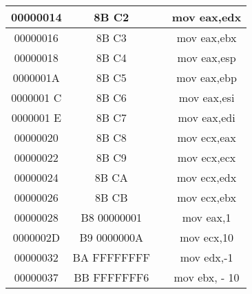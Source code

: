 \documentclass[10pt]{article}
\begin{document}
\begin{center}
\begin{tabular}{|c|c|c|c|}
\hline
00000014 & 8B C2 &  & mov eax,edx \\
\hline
00000016 & 8B C3 &  & mov eax,ebx \\
\hline
00000018 & 8B C4 &  & mov eax,esp \\
\hline
0000001A & 8B C5 &  & mov eax,ebp \\
\hline
0000001 C & 8B C6 &  & mov eax,esi \\
\hline
0000001 E & 8B C7 &  & mov eax,edi \\
\hline
00000020 & 8B C8 &  & mov ecx,eax \\
\hline
00000022 & 8B C9 &  & mov ecx,ecx \\
\hline
00000024 & 8B CA &  & mov ecx,edx \\
\hline
00000026 & 8B CB &  & mov ecx,ebx \\
\hline
00000028 & B8 00000001 &  & mov eax,1 \\
\hline
0000002D & B9 0000000A &  & mov ecx,10 \\
\hline
00000032 & BA FFFFFFFF &  & mov edx,-1 \\
\hline
00000037 & BB FFFFFFF6 &  & mov ebx, - 10 \\
\hline
\end{tabular}
\end{center}
\end{document}
